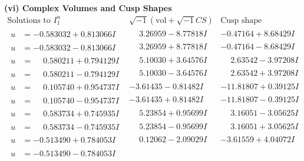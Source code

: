 \documentclass[1p]{elsarticle_modified}
\theoremstyle{definition}
\newcommand{\I}{\sqrt{-1}}
\begin{document}
\newpage\flushleft \textbf{(vi) Complex Volumes and Cusp Shapes}
$$\begin{array}{c|c|c}  
\text{Solutions to }I^u_{1}& \I (\text{vol} + \sqrt{-1}CS) & \text{Cusp shape}\\
 \hline 
\begin{aligned}
u &= -0.583032 + 0.813066 I\end{aligned}
 & \phantom{-}3.26959 - 8.77818 I & -0.47164 + 8.68429 I \\ \hline\begin{aligned}
u &= -0.583032 - 0.813066 I\end{aligned}
 & \phantom{-}3.26959 + 8.77818 I & -0.47164 - 8.68429 I \\ \hline\begin{aligned}
u &= \phantom{-}0.580211 + 0.794129 I\end{aligned}
 & \phantom{-}5.10030 + 3.64576 I & \phantom{-}2.63542 - 3.97208 I \\ \hline\begin{aligned}
u &= \phantom{-}0.580211 - 0.794129 I\end{aligned}
 & \phantom{-}5.10030 - 3.64576 I & \phantom{-}2.63542 + 3.97208 I \\ \hline\begin{aligned}
u &= \phantom{-}0.105740 + 0.954737 I\end{aligned}
 & -3.61435 - 0.81482 I & -11.81807 + 0.39125 I \\ \hline\begin{aligned}
u &= \phantom{-}0.105740 - 0.954737 I\end{aligned}
 & -3.61435 + 0.81482 I & -11.81807 - 0.39125 I \\ \hline\begin{aligned}
u &= \phantom{-}0.583734 + 0.745935 I\end{aligned}
 & \phantom{-}5.23854 + 0.95699 I & \phantom{-}3.16051 - 3.05625 I \\ \hline\begin{aligned}
u &= \phantom{-}0.583734 - 0.745935 I\end{aligned}
 & \phantom{-}5.23854 - 0.95699 I & \phantom{-}3.16051 + 3.05625 I \\ \hline\begin{aligned}
u &= -0.513490 + 0.784053 I\end{aligned}
 & \phantom{-}0.12062 - 2.09029 I & -3.61559 + 4.04072 I \\ \hline\begin{aligned}
u &= -0.513490 - 0.784053 I\end{aligned}

\end{array}$$
\end{document}
